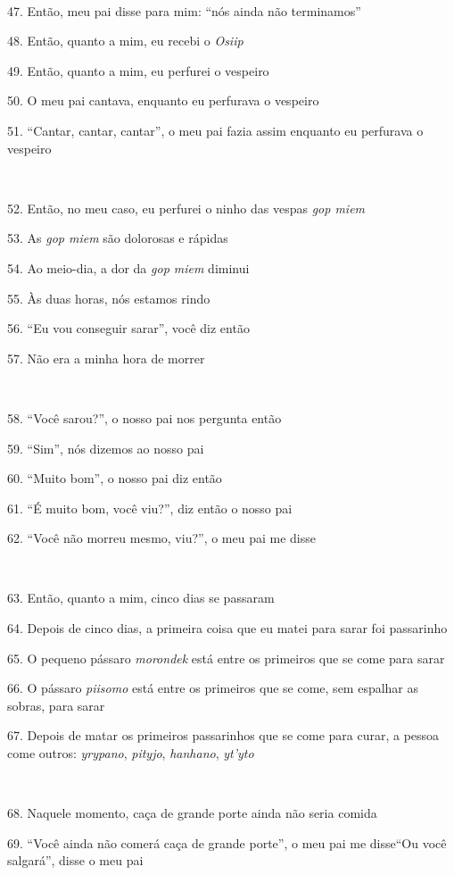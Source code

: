 ~

47. Então, meu pai disse para mim: ``nós ainda não terminamos''

48. Então, quanto a mim, eu recebi o \emph{Osiip}

49. Então, quanto a mim, eu perfurei o vespeiro

50. O meu pai cantava, enquanto eu perfurava o vespeiro

51. ``Cantar, cantar, cantar'', o meu pai fazia assim enquanto eu perfurava o vespeiro

~

52. Então, no meu caso, eu perfurei o ninho das vespas \emph{gop miem}

53. As \emph{gop miem} são dolorosas e rápidas

54. Ao meio-dia, a dor da \emph{gop miem} diminui

55. Às duas horas, nós estamos rindo

56. ``Eu vou conseguir sarar'', você diz então

57. Não era a minha hora de morrer

~

58. ``Você sarou?'', o nosso pai nos pergunta então

59. ``Sim'', nós dizemos ao nosso pai

60. ``Muito bom'', o nosso pai diz então

61. ``É muito bom, você viu?'', diz então o nosso pai

62. ``Você não morreu mesmo, viu?'', o meu pai me disse

~

63. Então, quanto a mim, cinco dias se passaram

64. Depois de cinco dias, a primeira coisa que eu matei para sarar foi
passarinho

65. O pequeno pássaro \emph{morondek} está entre os primeiros que se come
para sarar

66. O pássaro \emph{piisomo} está entre os primeiros que se come, sem
espalhar as sobras, para sarar

67. Depois de matar os primeiros passarinhos que se come para curar, a
pessoa come outros: \emph{yrypano}, \emph{pityjo}, \emph{hanhano},
\emph{yt'yto}

~

68. Naquele momento, caça de grande porte ainda não seria comida

69. ``Você ainda não comerá caça de grande porte'', o meu pai me
disse``Ou você salgará'', disse o meu pai

